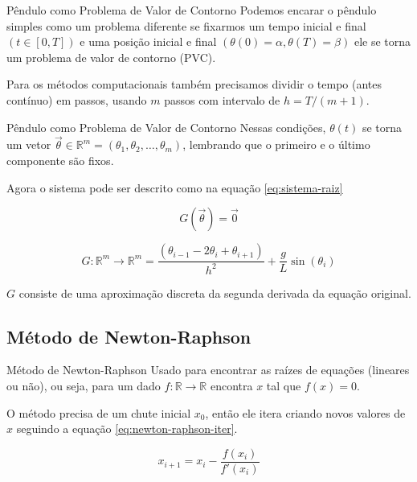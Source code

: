 \documentclass[11pt]{beamer}
\begin{document}
\begin{frame}{Pêndulo como Problema de Valor de Contorno}
    Podemos encarar o pêndulo simples como um problema diferente se fixarmos um tempo inicial e final $(t\in [0,T])$ e uma posição inicial e final $(\theta(0) = \alpha, \theta(T) = \beta)$ ele se torna um problema de valor de contorno (PVC).

    \vspace{0.4cm}
    \pause

    Para os métodos computacionais também precisamos dividir o tempo (antes contínuo) em passos, usando $m$ passos com intervalo de $h = T/(m+1)$.
\end{frame}

\begin{frame}{Pêndulo como Problema de Valor de Contorno}
    Nessas condições, $\theta(t)$ se torna um vetor $\vec\theta\in\mathbb R^m = (\theta_1, \theta_2, \dots, \theta_m)$, lembrando que o primeiro e o último componente são fixos.
    
    \vspace{0.3cm}
    \pause

    Agora o sistema pode ser descrito como na equação \ref{eq:sistema-raiz}

    \begin{equation}
        G(\vec\theta) = \vec0
        \label{eq:sistema-raiz}
    \end{equation}

    \begin{equation}
        G:\mathbb R^m \to \mathbb R^m = \frac{(\theta_{i-1} - 2\theta_i + \theta_{i+1})}{h^2} + \frac{g}{L}\sin(\theta_i)
    \end{equation}

    $G$ consiste de uma aproximação discreta da segunda derivada da equação original.
\end{frame}

\subsection{Método de Newton-Raphson}

\begin{frame}{Método de Newton-Raphson}
    Usado para encontrar as raízes de equações (lineares ou não), ou seja, para um dado $f:\mathbb R \to \mathbb R$ encontra $x$ tal que $f(x) = 0$.
    
    \vspace{0.4cm}
    
    O método precisa de um chute inicial $x_0$, então ele itera criando novos valores de $x$ seguindo a equação \ref{eq:newton-raphson-iter}.

    \begin{equation}
        x_{i+1} = x_i - \frac{f(x_i)}{f'(x_i)}
        \label{eq:newton-raphson-iter}
    \end{equation}
\end{frame}
\end{document}

